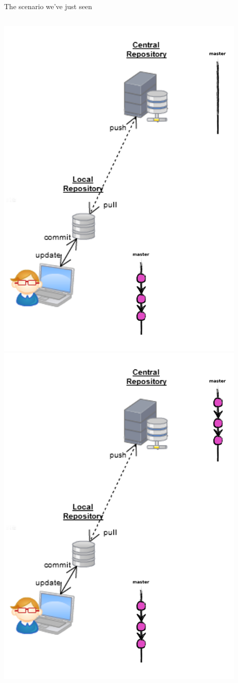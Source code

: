 \begin{frame}[fragile]{The scenario we've just seen}
\begin{columns}
\begin{column}{0.4\textwidth}
\begin{center}
{			}\only<6> {
				\includegraphics[width=0.9\textwidth]{branch_delete.png}
			}\only<7> {
				\includegraphics[width=0.9\textwidth]{branch_pushed.png}
}
\end{center}
\end{column}
\end{columns}
\end{frame}
